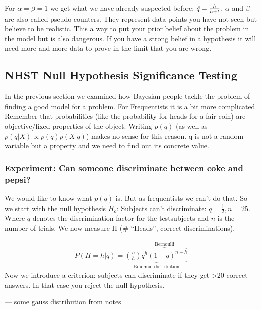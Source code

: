 
For $\alpha = \beta =1$ we get what we have already suspected before: $\est{q}=\frac{h}{h+t}$. $\alpha$ and $\beta$ are also called pseudo-counters. They represent data points you have not seen but believe to be realistic. This a way to put your prior belief about the problem in the model but is also dangerous. If you have a strong belief in a hypothesis it will need more and more data to prove in the limit that you are wrong.

\subsection[Null Hypothesis Significance Testing (NHST)]{NHST Null Hypothesis Significance Testing}
In the previous section we examined how Bayesian people tackle the problem of finding a good model for a problem. For Frequentists it is a bit more complicated. Remember that probabilities (like the probability for heads for a fair coin) are objective/fixed properties of the object. Writing $p(q)$ (as well as $p(q|X) \propto p(q)p(X|q)$) makes no sense for this reason. q is not a random variable but a property and we need to find out its concrete value.

\subsubsection*{Experiment: Can someone discriminate between coke and pepsi?}

We would like to know what $p(q)$ is. But as frequentists we can't do that. So we start with the null hypothesis $H_o$: Subjects can't discriminate: $q = \frac{1}{2}, n = 25$. Where $q$ denotes the discrimination factor for the testsubjects and $n$ is the number of trials. We now measure H (\# ``Heads'', correct discriminations).

\begin{align*}
P(H=h|q) = \underbrace{ \binom{n}{h} \overbrace{q^h (1-q)^{n-h}}^\text{Bernoulli} }_\text{Binomial distribution}
\end{align*}
Now we introduce a criterion: subjects can discriminate if they get >20 correct answers. In that case you reject the null hypothesis.

--- some gauss distribution from notes

